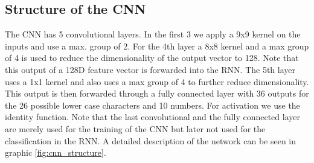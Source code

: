 \documentclass{utue} %
\begin{document}
\subsection{Structure of the CNN}
The CNN has 5 convolutional layers. In the first 3 we apply a 9x9 kernel on the inputs and use a max. group of 2. For the 4th layer a 8x8 kernel and a max group of 4 is used to reduce the dimensionality of the output vector to 128. Note that this output of a 128D feature vector is forwarded into the RNN. The 5th layer uses a 1x1 kernel %
and also uses a max group of 4 to further reduce dimensionality. This output is then forwarded through a fully connected layer with 36 outputs for the 26 possible lower case characters and 10 numbers. For activation we use the identity function. Note that the last convolutional and the fully connected layer are merely used for the training of the CNN but later not used for the classification in the RNN. A detailed description of the network can be seen in graphic \ref{fig:cnn_structure}.
\end{document}
